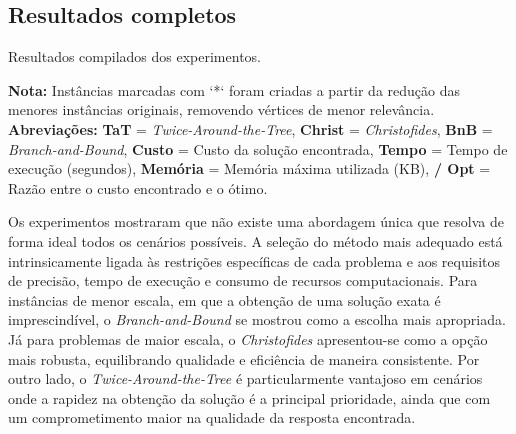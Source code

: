 \documentclass[12pt]{article}
\begin{document}
\newpage
\subsection{Resultados completos}
\begin{table}[H]
\centering
\caption{Resultados compilados dos experimentos.}
\label{tab:resultados_compilados}
\vspace{0.3cm}
\begin{minipage}{\textwidth}
\footnotesize
\textbf{Nota:} Instâncias marcadas com `*` foram criadas a partir da redução das menores instâncias originais, removendo vértices de menor relevância. \textbf{Abreviações:} \textbf{TaT} = \textit{Twice-Around-the-Tree}, \textbf{Christ} = \textit{Christofides}, \textbf{BnB} = \textit{Branch-and-Bound}, \textbf{Custo} = Custo da solução encontrada, \textbf{Tempo} = Tempo de execução (segundos), \textbf{Memória} = Memória máxima utilizada (KB), \textbf{/ Opt} = Razão entre o custo encontrado e o ótimo.
\end{minipage}
\end{table}


Os experimentos mostraram que não existe uma abordagem única que resolva de forma ideal todos os cenários possíveis. A seleção do método mais adequado está intrinsicamente ligada às restrições específicas de cada problema e aos requisitos de precisão, tempo de execução e consumo de recursos computacionais. Para instâncias de menor escala, em que a obtenção de uma solução exata é imprescindível, o \textit{Branch-and-Bound} se mostrou como a escolha mais apropriada. Já para problemas de maior escala, o \textit{Christofides} apresentou-se como a opção mais robusta, equilibrando qualidade e eficiência de maneira consistente. Por outro lado, o \textit{Twice-Around-the-Tree} é particularmente vantajoso em cenários onde a rapidez na obtenção da solução é a principal prioridade, ainda que com um comprometimento maior na qualidade da resposta encontrada.
\end{document}
